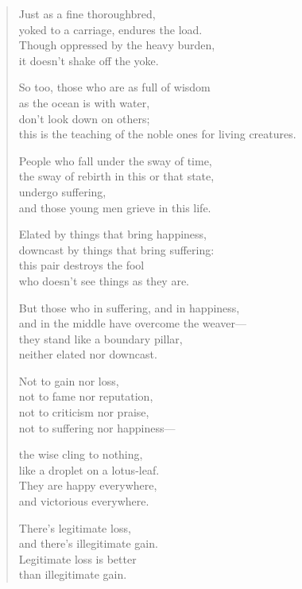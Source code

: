 \documentclass[12pt,openany]{book}%
\begin{document}
\begin{verse}%
Just as a fine thoroughbred, \\
yoked to a carriage, endures the load. \\
Though oppressed by the heavy burden, \\
it doesn’t shake off the yoke. 

So too, those who are as full of wisdom \\
as the ocean is with water, \\
don’t look down on others; \\
this is the teaching of the noble ones for living creatures. 

People who fall under the sway of time, \\
the sway of rebirth in this or that state, \\
undergo suffering, \\
and those young men grieve in this life. 

Elated by things that bring happiness, \\
downcast by things that bring suffering: \\
this pair destroys the fool \\
who doesn’t see things as they are. 

But those who in suffering, and in happiness, \\
and in the middle have overcome the weaver—\\
they stand like a boundary pillar, \\
neither elated nor downcast. 

Not to gain nor loss, \\
not to fame nor reputation, \\
not to criticism nor praise, \\
not to suffering nor happiness—

the wise cling to nothing, \\
like a droplet on a lotus-leaf. \\
They are happy everywhere, \\
and victorious everywhere. 

There’s legitimate loss, \\
and there’s illegitimate gain. \\
Legitimate loss is better \\
than illegitimate gain. 


\end{verse}
\end{document}
